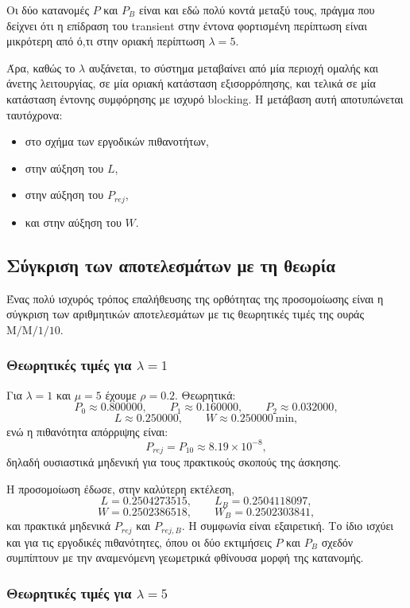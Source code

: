 \documentclass{article}
\begin{document}
Οι δύο κατανομές $P$ και $P_B$ είναι και εδώ πολύ κοντά μεταξύ τους, πράγμα που δείχνει ότι η επίδραση του transient στην έντονα φορτισμένη περίπτωση είναι μικρότερη από ό,τι στην οριακή περίπτωση $\lambda=5$.

Άρα, καθώς το $\lambda$ αυξάνεται, το σύστημα μεταβαίνει από μία περιοχή ομαλής και άνετης λειτουργίας, σε μία οριακή κατάσταση εξισορρόπησης, και τελικά σε μία κατάσταση έντονης συμφόρησης με ισχυρό blocking. Η μετάβαση αυτή αποτυπώνεται ταυτόχρονα:
\begin{itemize}
    \item στο σχήμα των εργοδικών πιθανοτήτων,
    \item στην αύξηση του $L$,
    \item στην αύξηση του $P_{rej}$,
    \item και στην αύξηση του $W$.
\end{itemize}

\subsection{Σύγκριση των αποτελεσμάτων με τη θεωρία}

Ένας πολύ ισχυρός τρόπος επαλήθευσης της ορθότητας της προσομοίωσης είναι η σύγκριση των αριθμητικών αποτελεσμάτων με τις θεωρητικές τιμές της ουράς $\mathrm{M/M/1/10}$.

\subsubsection*{Θεωρητικές τιμές για $\lambda=1$}

Για $\lambda=1$ και $\mu=5$ έχουμε $\rho=0.2$. Θεωρητικά:
\[
P_0 \approx 0.800000,\qquad P_1 \approx 0.160000,\qquad P_2 \approx 0.032000,
\]
\[
L \approx 0.250000,\qquad W \approx 0.250000 \ \text{min},
\]
ενώ η πιθανότητα απόρριψης είναι:
\[
P_{rej}=P_{10}\approx 8.19\times 10^{-8},
\]
δηλαδή ουσιαστικά μηδενική για τους πρακτικούς σκοπούς της άσκησης.

Η προσομοίωση έδωσε, στην καλύτερη εκτέλεση,
\[
L=0.2504273515,\qquad L_B=0.2504118097,
\]
\[
W=0.2502386518,\qquad W_B=0.2502303841,
\]
και πρακτικά μηδενικά $P_{rej}$ και $P_{rej,B}$. Η συμφωνία είναι εξαιρετική. Το ίδιο ισχύει και για τις εργοδικές πιθανότητες, όπου οι δύο εκτιμήσεις $P$ και $P_B$ σχεδόν συμπίπτουν με την αναμενόμενη γεωμετρικά φθίνουσα μορφή της κατανομής.

\subsubsection*{Θεωρητικές τιμές για $\lambda=5$}
\end{document}
